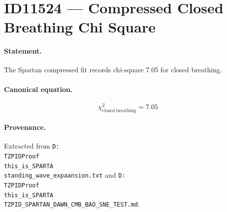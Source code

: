 \section*{ID11524 --- Compressed Closed Breathing Chi Square}

\paragraph{Statement.}
The Spartan compressed fit records chi-square 7.05 for closed breathing.

\paragraph{Canonical equation.}
\[
\chi^2_{\mathrm{closed\ breathing}}=7.05
\]

\paragraph{Provenance.}
Extracted from \texttt{D:\\TZPIDProof\\this\_is\_SPARTA\\standing\_wave\_expaansion.txt} and \texttt{D:\\TZPIDProof\\this\_is\_SPARTA\\TZPID\_SPARTAN\_DAWN\_CMB\_BAO\_SNE\_TEST.md}.
